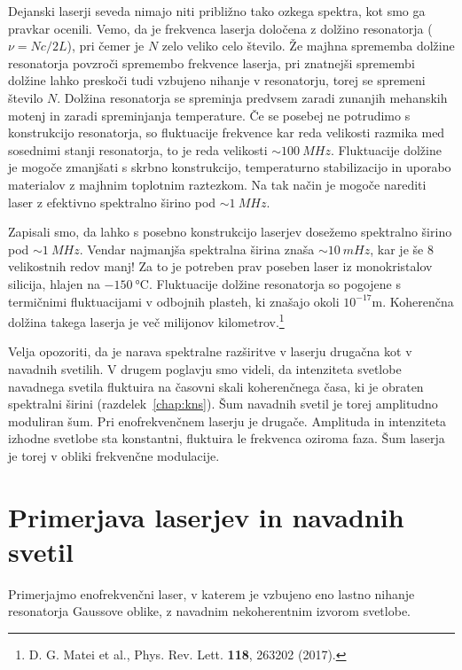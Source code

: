 Dejanski laserji seveda nimajo niti približno tako ozkega spektra, kot smo ga
pravkar ocenili. Vemo, da je frekvenca laserja določena z dolžino resonatorja 
($\nu=N c/2L$), pri čemer je $N$ zelo veliko celo število. Že majhna
sprememba dolžine resonatorja povzroči spremembo frekvence laserja, pri 
znatnejši spremembi dolžine lahko preskoči tudi vzbujeno
nihanje v resonatorju, torej se spremeni število $N$. Dolžina resonatorja se 
spreminja predvsem zaradi zunanjih mehanskih motenj in zaradi spreminjanja
temperature. Če se posebej ne potrudimo s konstrukcijo resonatorja, so 
fluktuacije frekvence kar reda velikosti razmika med sosednimi stanji 
resonatorja, to je reda velikosti $\sim 100~\si{MHz}$. 
Fluktuacije dolžine je mogoče zmanjšati s skrbno konstrukcijo, 
temperaturno stabilizacijo in uporabo materialov z majhnim toplotnim raztezkom. 
Na tak način je mogoče narediti laser z efektivno spektralno širino pod $\sim 1~\si{MHz}$.

\begin{remark}
Zapisali smo, da lahko s posebno konstrukcijo laserjev dosežemo
spektralno širino pod $\sim 1~\si{MHz}$. Vendar najmanjša spektralna širina
znaša $\sim 10~\si{mHz}$, kar je še 8 velikostnih redov manj! Za to je potreben prav poseben 
laser iz monokristalov silicija, hlajen na $-150~\si{\celsius}$. Fluktuacije
dolžine resonatorja so pogojene s termičnimi fluktuacijami v odbojnih plasteh, 
ki znašajo okoli $10^{-17}\si{\metre}$. Koherenčna dolžina takega laserja je več
milijonov kilometrov.\footnote{D. G. Matei et al., Phys. Rev. Lett. {\bf 118}, 263202 (2017).} 
\end{remark}

Velja opozoriti, da je narava spektralne razširitve v laserju 
drugačna kot v navadnih svetilih. V drugem poglavju smo videli, da 
intenziteta svetlobe navadnega svetila fluktuira na časovni skali 
koherenčnega časa, ki je obraten spektralni širini (razdelek~\ref{chap:kns}). 
Šum navadnih svetil je torej amplitudno moduliran šum. Pri 
enofrekvenčnem laserju je drugače. Amplituda in intenziteta 
izhodne svetlobe sta konstantni, fluktuira le frekvenca oziroma
faza. Šum laserja je torej v obliki frekvenčne modulacije.

\section{Primerjava laserjev in navadnih svetil}
Primerjajmo enofrekvenčni laser, v katerem je vzbujeno eno lastno nihanje
resonatorja Gaussove oblike, z navadnim nekoherentnim izvorom svetlobe.

